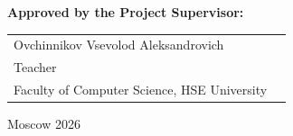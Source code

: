 \begin{titlepage}

\vspace{1em}
{\bf Approved by the Project Supervisor: \vspace{2mm}}

{
\begin{tabular}{l@{\hskip 1.5cm}l}
Ovchinnikov Vsevolod Aleksandrovich\\
Teacher\\
Faculty of Computer Science, HSE University 
\end{tabular}}





\vspace{\fill}

\begin{center}
Moscow 2026
\end{center}

\end{titlepage}